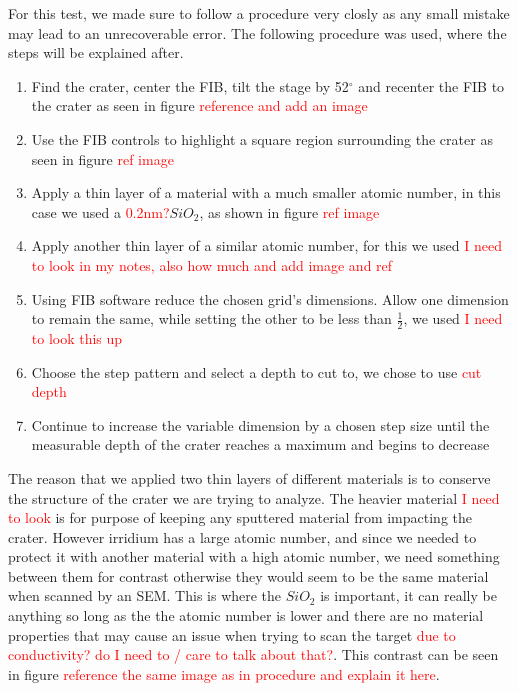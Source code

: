 \documentclass[review]{elsarticle}
\begin{document}
			For this test, we made sure to follow a procedure very closly as any small mistake may lead to an unrecoverable error. The following procedure was used, where the steps will be
			explained after.
			\begin{enumerate}
				\item {Find the crater, center the FIB, tilt the stage by 52$^{\circ}$ and recenter the FIB to the crater as seen in figure \textcolor{red}{reference and add an image}}
				\item {Use the FIB controls to highlight a square region surrounding the crater as seen in figure \textcolor{red}{ref image}}
				\item {Apply a thin layer of a material with a much smaller atomic number, in this case we used a \textcolor{red}{0.2nm?}$SiO_2$, as shown in figure \textcolor{red}{ref image}}
				\item {Apply another thin layer of a similar atomic number, for this we used \textcolor{red}{I need to look in my notes, also how much and add image and ref}}
				\item {Using FIB software reduce the chosen grid's dimensions. Allow one dimension to remain the same, while setting the other to be less than $\frac{1}{2}$, we used 
						\textcolor{red}{I need to look this up}}
				\item {Choose the step pattern and select a depth to cut to, we chose to use \textcolor{red}{cut depth}}
				\item {Continue to increase the variable dimension by a chosen step size until the measurable depth of the crater reaches a maximum and begins to decrease}
			\end{enumerate}
			
			The reason that we applied two thin layers of different materials is to conserve the structure of the crater we are trying to analyze. The heavier material 
			\textcolor{red}{I need to look} is for purpose of keeping any sputtered material from impacting the crater. However irridium has a large atomic number, and since 
			we needed to protect it with another material with a high atomic number, we need something between them for contrast otherwise they would seem to be the same material 
			when scanned by an SEM. This is where the $SiO_2$ is important, it can really be anything so long as the the atomic number is lower and there are no material properties that
			may cause an issue when trying to scan the target \textcolor{red}{due to conductivity? do I need to / care to talk about that?}. This contrast can be seen in figure 
			\textcolor{red}{reference the same image as in procedure and explain it here}. 
\end{document}
